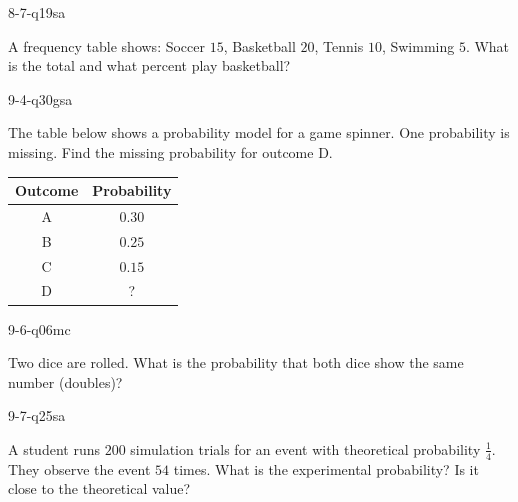 \begin{practiceQuestion}{8-7-q19}{sa}
\begin{questionText}
A frequency table shows: Soccer $15$, Basketball $20$, Tennis $10$, Swimming $5$. What is the total and what percent play basketball?
\end{questionText}
\end{practiceQuestion}

\begin{practiceQuestion}{9-4-q30}{gsa}
\begin{questionText}
The table below shows a probability model for a game spinner. One probability is missing. Find the missing probability for outcome D.

\begin{center}
\begin{tabular}{|c|c|}
\hline
\textbf{Outcome} & \textbf{Probability} \\
\hline
A & $0.30$ \\
\hline
B & $0.25$ \\
\hline
C & $0.15$ \\
\hline
D & ? \\
\hline
\end{tabular}
\end{center}
\end{questionText}
\end{practiceQuestion}

\begin{practiceQuestion}{9-6-q06}{mc}
\begin{questionText}
Two dice are rolled. What is the probability that both dice show the same number (doubles)?
\end{questionText}
\end{practiceQuestion}

\begin{practiceQuestion}{9-7-q25}{sa}
\begin{questionText}
A student runs $200$ simulation trials for an event with theoretical probability $\frac{1}{4}$. They observe the event $54$ times. What is the experimental probability? Is it close to the theoretical value?
\end{questionText}
\end{practiceQuestion}
